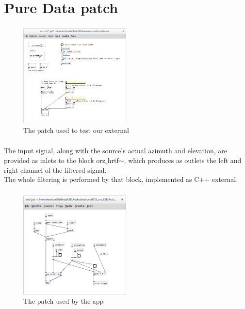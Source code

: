 \documentclass{beamer}
\begin{document}
	\section{Pure Data patch}

	\begin{frame}
		\frametitle{\insertsection}
		\begin{figure}
			\centering
			  \includegraphics[width=0.5\textwidth]{images/Test_patch.png}
			  \caption{The patch used to test our external}
			  \label{fig:test}
		\end{figure}
	\end{frame}
	
	\begin{frame}
		\frametitle{\insertsection}
		The input signal, along with the source's actual azimuth and elevation, are provided
		as inlets to the block orz$\_$hrtf$\sim$, which produces as outlets the
		left and right channel of the filtered signal.\\
		The whole filtering is performed by that block, implemented as C++ external.\\
	\end{frame}

	\begin{frame}
		\frametitle{\insertsection}
		\begin{figure}
			\centering
			  \includegraphics[width=0.5\textwidth]{images/iOS_patch.png}
			  \caption{The patch used by the app}
			  \label{fig:ios_pd}
		\end{figure}
	\end{frame}
\end{document}
